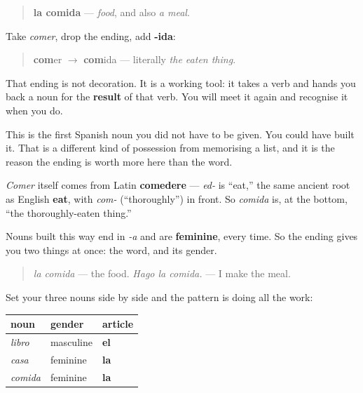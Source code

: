 \begin{cousinweb}
\begin{quote}
\textbf{la comida} — \emph{food}, and also \emph{a meal}.
\end{quote}

Take \emph{comer}, drop the ending, add \textbf{-ida}:

\begin{quote}
\textbf{com}er $\to$ \textbf{com}ida — literally \emph{the eaten thing}.
\end{quote}

That ending is not decoration. It is a working tool: it takes a verb and hands you back a noun for the \textbf{result} of that verb. You will meet it again and recognise it when you do.

This is the first Spanish noun you did not have to be given. You could have built it. That is a different kind of possession from memorising a list, and it is the reason the ending is worth more here than the word.

\emph{Comer} itself comes from Latin \textbf{comedere} — \emph{ed-} is \textquotedblleft{}eat,\textquotedblright{} the same ancient root as English \textbf{eat}, with \emph{com-} (\textquotedblleft{}thoroughly\textquotedblright{}) in front. So \emph{comida} is, at the bottom, \textquotedblleft{}the thoroughly-eaten thing.\textquotedblright{}
\end{cousinweb}

\begin{grammarlens}[title={Grammar Lens: -ida nouns are feminine}]
Nouns built this way end in \emph{-a} and are \textbf{feminine}, every time. So the ending gives you two things at once: the word, and its gender.

\begin{quote}
\emph{la comida} — the food. \emph{Hago la comida.} — I make the meal.
\end{quote}

Set your three nouns side by side and the pattern is doing all the work:

\noindent
\begin{tabularx}{\linewidth}{@{}>{\raggedright\arraybackslash}X>{\raggedright\arraybackslash}X>{\raggedright\arraybackslash}X@{}}
\toprule
\textbf{noun} & \textbf{gender} & \textbf{article} \\
\midrule
\emph{libro} & masculine & \textbf{el} \\
\emph{casa} & feminine & \textbf{la} \\
\emph{comida} & feminine & \textbf{la} \\
\bottomrule
\end{tabularx}
\end{grammarlens}


